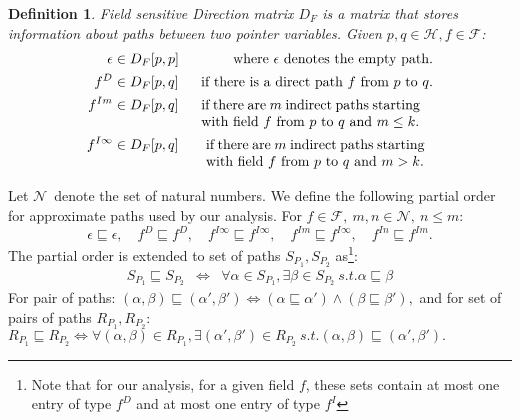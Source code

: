 \documentclass[letterpaper]{sig-alternate}
\newtheorem{definition}{Definition}
\newcommand{\p}{\ensuremath{p}}
\newcommand{\q}{\ensuremath{q}}
\newcommand{\drct}{\ensuremath{D}}
\newcommand{\indrct}{\ensuremath{I}}
\newcommand{\heap}{\ensuremath{\mathcal{H}}}
\newcommand{\fields}{\ensuremath{\mathcal{F}}}
\newcommand{\nat}{\ensuremath{\mathcal{N}}}
\newcommand{\DFM}[2]{\ensuremath{D_F[#1,#2]}}
\newcommand{\sub}[2]{\ensuremath{{#1}_{#2}}}
\begin{document}
\begin{definition}
\label{DFM_matrix}
Field sensitive Direction matrix
$\sub{D}{F}$ is a matrix that stores information 
about paths between two pointer variables.
Given $\p, \q \in
\heap, f \in \fields$:
\begin{eqnarray*}
  \epsilon & \in \DFM{p}{p}& \mbox{ where $\epsilon$
    denotes the empty path.} \\
  f^\drct  &\in  \DFM{p}{q} & \mbox{ if there is a direct
    path $f$ from $\p$ to $\q$.}\\
  f^{\indrct m} & \in  \DFM{p}{q} & 
  \mbox{\begin{tabular}[t]{p{55mm}}if there are $m$ indirect
      paths starting with field $f$ from $\p$ to $\q$ and $m
      \leq k.$
    \end{tabular}
  } \\
  f^{\indrct\infty} & \in  \DFM{p}{q} &
  \mbox{\begin{tabular}[t]{p{55mm}}if there are $m$ indirect
      paths starting with field $f$ from $\p$ to $\q$ and $m >
      k.$
  \end{tabular}}  
\end{eqnarray*}
\end{definition}

Let \nat\ denote the set of natural numbers. We define the
following partial order for approximate paths used by our
analysis. For $ f \in \fields,\ m,n \in \nat,\ n \leq m$:
$$
\epsilon \sqsubseteq \epsilon, \quad 
f^\drct \sqsubseteq  f^\drct,  \quad
f^{\indrct\infty}  \sqsubseteq  f^{\indrct\infty}, \quad
f^{\indrct m} \sqsubseteq f^{\indrct\infty}, \quad
f^{\indrct n} \sqsubseteq f^{\indrct m}. 
$$
The partial order is extended to set of paths $S_{P_1},
S_{P_2}$ as\footnote{Note that for our analysis, for a given
  field $f$, these sets contain at most one entry of type
  $f^\drct$ and at most one entry of type $f^\indrct$}:
\begin{eqnarray*}
  S_{P_1} \sqsubseteq S_{P_2} &\Leftrightarrow& \forall \alpha \in
  S_{P_1}, \exists \beta \in S_{P_2}\ s.t. \alpha \sqsubseteq \beta
\end{eqnarray*}
For pair of paths:
$  (\alpha, \beta) \sqsubseteq (\alpha', \beta') 
  \Leftrightarrow 
   (\alpha \sqsubseteq \alpha')  \wedge
  (\beta \sqsubseteq  \beta'), $
and for set of pairs of paths $R_{P_1}, R_{P_2}$:
  $R_{P_1} \sqsubseteq R_{P_2} \Leftrightarrow \forall
  (\alpha, \beta) \in
  R_{P_1}, \exists (\alpha', \beta') \in
  R_{P_2}\ s.t. (\alpha, \beta) \sqsubseteq (\alpha', \beta').$
\end{document}
